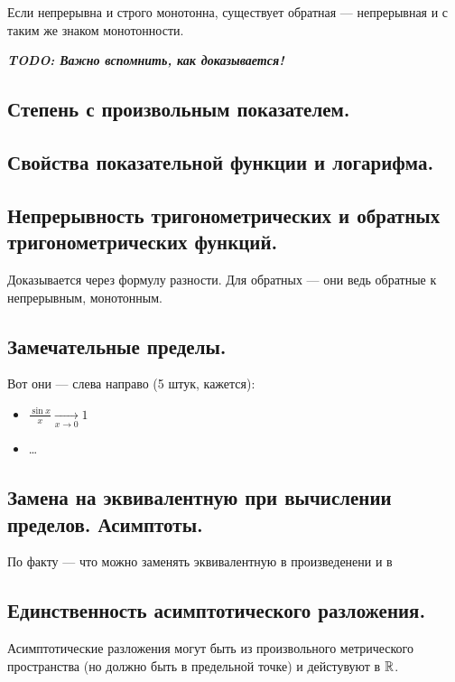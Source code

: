 \documentclass[12pt, a4paper]{article}
\begin{document}
Если непрерывна и строго монотонна, существует обратная — непрерывная и с таким же знаком монотонности.

\textbf{\emph{TODO: Важно вспомнить, как доказывается!}}

\subsection{Степень с произвольным показателем.}

\subsection{Свойства показательной функции и логарифма.}

\subsection{Непрерывность тригонометрических и обратных тригонометрических функций.}

Доказывается через формулу разности.
Для обратных — они ведь обратные к непрерывным, монотонным.

\subsection{Замечательные пределы.}

Вот они — слева направо (5 штук, кажется):

\begin{itemize}
    \item $\frac{\sin x}{x} \underset{x \to 0}{\longrightarrow} 1$
    \item …
\end{itemize}

\subsection{Замена на эквивалентную при вычислении пределов. Асимптоты.}

По факту — что можно заменять эквивалентную в произведенени и в 

\subsection{Единственность асимптотического разложения.}

Асимптотические разложения могут быть из произвольного метрического пространства 
(но должно быть в предельной точке) и дейстувуют в ${\mathbb{R}}$.
\end{document}
